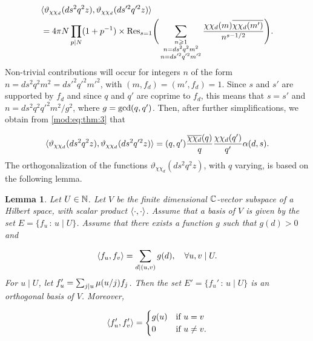 \documentclass[leqno,10pt]{amsart}
\theoremstyle{plain}
\numberwithin{equation}{section}
\newtheorem{lemme}[thm]{Lemma}
\theoremstyle{definition}
\theoremstyle{remark}
\begin{document}
\begin{equation}\label{mod:eq:thm:3}
\begin{split}
&\langle \vartheta_{\chi\chi_d}(ds^2q^2 z),\vartheta_{\chi\chi_d}(ds'^2q'^2 z)\rangle\\
&= 4 \pi N \prod_{p\vert N}(1+p^{-1}) 
\times \textnormal{Res}_{s=1} \Bigg(\sum_{\substack{n\geqslant 1\\n=ds^2q^2m^2\\n=ds'^2q'^2m'^2}} \frac{\chi\chi_d(m) \overline{\chi\chi_{d}(m')}}{n^{s-1/2}}\Bigg).
\end{split}
\end{equation}
Non-trivial contributions will occur for integers $n$ of the form $n=ds^2q^2m^2=ds'^2q'^2m'^2$, with $(m,f_d)=(m',f_d)=1$. Since $s$ and $s'$ are supported by $f_d$ and since $q$ and $q'$ are coprime to $f_d$, this means that $s=s'$ and $n=ds^2q^2q'^2m^2/g^2$, where $g=\textnormal{gcd}(q,q')$. Then, after further simplifications, we obtain from \eqref{mod:eq:thm:3} that

\begin{equation}\label{mod:eq:thm:4}
\langle \vartheta_{\chi\chi_d}(ds^2q^2 z),\vartheta_{\chi\chi_d}(ds^2q'^2 z)\rangle 
= (q,q') \frac{\overline{\chi\chi_d}(q)}{q} \frac{\chi\chi_d(q')}{q'} \alpha(d,s).
\end{equation}
The orthogonalization of the functions $\vartheta_{\chi\chi_d}(ds^2q^2 z)$, with $q$ varying, is based on the following lemma.

\begin{lemme}\label{mod:lemme:2}
Let $U\in \mathbb{N}$. Let $V$ be the finite dimensional $\mathbb{C}$-vector subspace of a Hilbert space, with scalar product $\langle\cdot,\cdot\rangle$. Assume that a basis of $V$ is given by the set $E=\{f_u\,:\,u\mid U\}$. Assume that there exists a function $g$ such that $g(d)>0$ and

\begin{equation}\label{mod:eq:lemme2:1}
\langle f_u,f_v\rangle = \sum_{d\vert (u,v)} g(d), \quad \forall u,v \mid U.
\end{equation}
For $u \mid U$, let $f_u' = \sum_{j\vert u} \mu(u/j) f_j$.
Then the set $E'=\{f_u'\,:\,u \mid U\}$ is an orthogonal basis of $V$. Moreover,

\begin{equation}\label{mod:eq:lemme2:2}
\langle f_u',f_v'\rangle =\begin{cases}
g(u)&\textnormal{if }u=v\\
0&\textnormal{if }u\neq v.\end{cases}
\end{equation}
\end{lemme}
\end{document}
